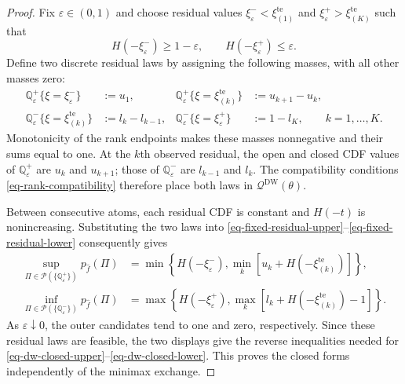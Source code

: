\documentclass[review,11pt,3p,authoryear,nopreprintline]{elsarticle}
\begin{document}
\begin{proof}
  Fix $\varepsilon\in(0,1)$ and choose residual values $\xi^-_\varepsilon<\xi_{(1)}^{\mathrm{te}}$ and $\xi^+_\varepsilon>\xi_{(K)}^{\mathrm{te}}$ such that
  \[
    H\left(-\xi^-_\varepsilon\right)\ge1-\varepsilon,
    \qquad H\left(-\xi^+_\varepsilon\right)\le\varepsilon.
  \]
  Define two discrete residual laws by assigning the following masses, with all other masses zero:
  \begin{equation}
    \begin{aligned}
      \mathbb Q^+_\varepsilon\{\xi=\xi^-_\varepsilon\}&:=u_1,
      &\mathbb Q^+_\varepsilon\{\xi=\xi_{(k)}^{\mathrm{te}}\}&:=u_{k+1}-u_k,\\
      \mathbb Q^-_\varepsilon\{\xi=\xi_{(k)}^{\mathrm{te}}\}&:=l_k-l_{k-1},
      &\mathbb Q^-_\varepsilon\{\xi=\xi^+_\varepsilon\}&:=1-l_K,
      \qquad k=1,\ldots,K.
    \end{aligned}
    \label{eq-extremal-residual-laws}
  \end{equation}
  Monotonicity of the rank endpoints makes these masses nonnegative and their sums equal to one. At the $k$th observed residual, the open and closed CDF values of $\mathbb Q^+_\varepsilon$ are $u_k$ and $u_{k+1}$; those of $\mathbb Q^-_\varepsilon$ are $l_{k-1}$ and $l_k$. The compatibility conditions \eqref{eq-rank-compatibility} therefore place both laws in $\mathcal Q^{\mathrm{DW}}(\theta)$.

  Between consecutive atoms, each residual CDF is constant and $H(-t)$ is nonincreasing. Substituting the two laws into \eqref{eq-fixed-residual-upper}--\eqref{eq-fixed-residual-lower} consequently gives
  \begin{align}
    \sup_{\Pi\in\mathcal P(\{\mathbb Q^+_\varepsilon\})}p_{\hat f}(\Pi)
    &=\min\left\{H\left(-\xi^-_\varepsilon\right),
      \min_k\left[u_k+H\left(-\xi_{(k)}^{\mathrm{te}}\right)\right]\right\},
      \label{eq-upper-extremal-value}\\
    \inf_{\Pi\in\mathcal P(\{\mathbb Q^-_\varepsilon\})}p_{\hat f}(\Pi)
    &=\max\left\{H\left(-\xi^+_\varepsilon\right),
      \max_k\left[l_k+H\left(-\xi_{(k)}^{\mathrm{te}}\right)-1\right]\right\}.
      \label{eq-lower-extremal-value}
  \end{align}
  As $\varepsilon\downarrow0$, the outer candidates tend to one and zero, respectively. Since these residual laws are feasible, the two displays give the reverse inequalities needed for \eqref{eq-dw-closed-upper}--\eqref{eq-dw-closed-lower}. This proves the closed forms independently of the minimax exchange.


\end{proof}
\end{document}
